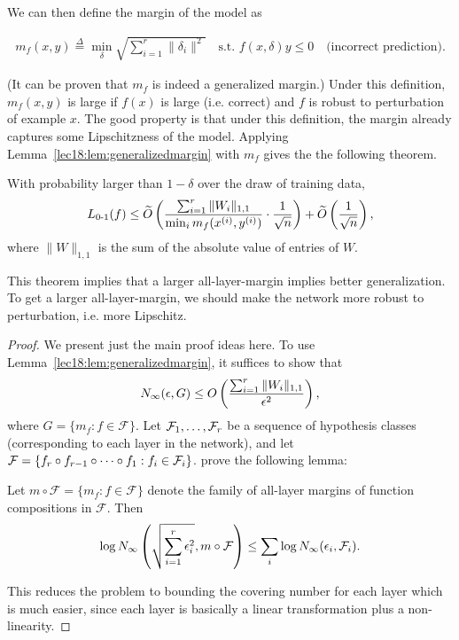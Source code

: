 We can then define the margin of the model as 

\begin{align}
    m_f(x,y) \overset{\Delta}{=} \min_{\delta} \sqrt{\sum_{i=1}^r \|\delta_i \|^2} \quad \text{s.t. } f(x, \delta) y \leq 0 \quad \text{(incorrect prediction)}.
\end{align}

(It can be proven that $m_f$ is indeed a generalized margin.) Under this definition, $m_f(x,y)$ is large if $f(x)$ is large (i.e. correct) and $f$ is robust to perturbation of example $x$. The good property is that under this definition, the margin already captures some Lipschitzness of the model. Applying Lemma~\ref{lec18:lem:generalizedmargin} with $m_f$ gives the the following theorem.

\begin{theorem}
\label{lec18:thm:alllayermargin}
With probability larger than $1-\delta$ over the draw of training data, 
\begin{align}
    L_{\textup{0-1}} (f) \le \widetilde{O} \left( \frac{\sum_{i=1}^r \|W_i \|_{1,1}}{\min_i m_f(x^{(i)}, y^{(i)})} \cdot \frac{1}{\sqrt{n}} \right) + \widetilde{O} \left( \frac{1}{\sqrt{n}} \right),
\end{align}
where $\| W \|_{1,1}$ is the sum of the absolute value of entries of $W$.
\end{theorem}

This theorem implies that a larger all-layer-margin implies better generalization. To get a larger all-layer-margin, we should make the network more robust to perturbation, i.e. more Lipschitz.

\begin{proof}
We present just the main proof ideas here. To use Lemma~\ref{lec18:lem:generalizedmargin}, it suffices to show that
\begin{equation}
N_\infty (\epsilon, G) \leq O \left( \frac{\sum_{i=1}^r \| W_i \|_{1,1} }{\epsilon^2} \right),
\end{equation}
where $G = \{ m_f : f \in \mathcal{F} \}$. Let $\mathcal F_1, \dots, \mathcal F_r$ be a sequence of hypothesis classes (corresponding to each layer in the network), and let $\mathcal F = \{ f_r \circ f_{r-1} \circ \dots \circ f_1: f_i \in \mathcal F_i \}$. \cite{wei2019improved} prove the following lemma:

\begin{lemma}
\label{lec18:lem:decomposition}
Let $m \circ \mathcal{F} = \{ m_f : f \in \mathcal{F}\}$ denote the family of all-layer margins of function compositions in $\mathcal{F}$. Then
\begin{align*}
    \log N_\infty \left( \sqrt{\sum_{i=1}^r \epsilon_i^2} , m\circ \mathcal{F} \right) \le \sum_i \log N_\infty (\epsilon_i, \mathcal{F}_i).
\end{align*}
\end{lemma}

This reduces the problem to bounding the covering number for each layer which is much easier, since each layer is basically a linear transformation plus a non-linearity.
\end{proof}